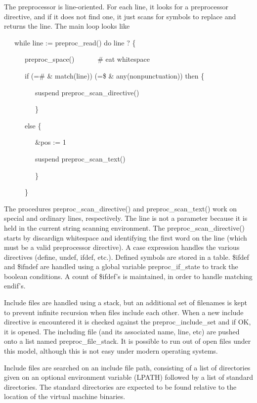The preprocessor is line-oriented. For each line, it looks for a
preprocessor directive, and if it does not find one, it just scans for
symbols to replace and returns the line. The main loop looks like

{\ttfamily\mdseries
\ \ \ while line := preproc\_read() do line ? \{}

{\ttfamily\mdseries
\ \ \ \ \ \ preproc\_space() \ \ \ \ \ \ \# eat whitespace}

{\ttfamily\mdseries
\ \ \ \ \ \ if (={\textquotedbl}\#{\textquotedbl} \& match({\textquotedbl}line{\textquotedbl})) {\textbar}
(={\textquotedbl}\${\textquotedbl} \& any(nonpunctuation)) then \{}

{\ttfamily\mdseries
\ \ \ \ \ \ \ \ \ suspend preproc\_scan\_directive()}

{\ttfamily\mdseries
\ \ \ \ \ \ \ \ \ \}}

{\ttfamily\mdseries
\ \ \ \ \ \ else \{}

{\ttfamily\mdseries
\ \ \ \ \ \ \ \ \ \&pos := 1}

{\ttfamily\mdseries
\ \ \ \ \ \ \ \ \ suspend preproc\_scan\_text()}

{\ttfamily\mdseries
\ \ \ \ \ \ \ \ \ \}}

{\ttfamily\mdseries
\ \ \ \ \ \ \}}


The procedures preproc\_scan\_directive() and preproc\_scan\_text()
work on special and ordinary lines, respectively.  The line is not a
parameter because it is held in the current string scanning
environment. The preproc\_scan\_directive() starts by discardign
whitespace and identifying the first word on the line (which must be a
valid preprocessor directive). A case expression handles the various
directives (define, undef, ifdef, etc.). Defined symbols are stored in
a table. \$ifdef and \$ifndef are handled using a global variable
preproc\_if\_state to track the boolean conditions. A count of
\$ifdef's is maintained, in order to handle matching endif's.

Include files are handled using a stack, but an additional set of
filenames is kept to prevent infinite recursion when files include
each other. When a new include directive is encountered it is checked
against the preproc\_include\_set and if OK, it is opened. The
including file (and its associated name, line, etc) are pushed onto a
list named preproc\_file\_stack. It is possible to run out of open
files under this model, although this is not easy under modern
operating systems.

Include files are searched on an include file path, consisting of a
list of directories given on an optional environment variable (LPATH)
followed by a list of standard directories. The standard directories
are expected to be found relative to the location of the virtual
machine binaries.

